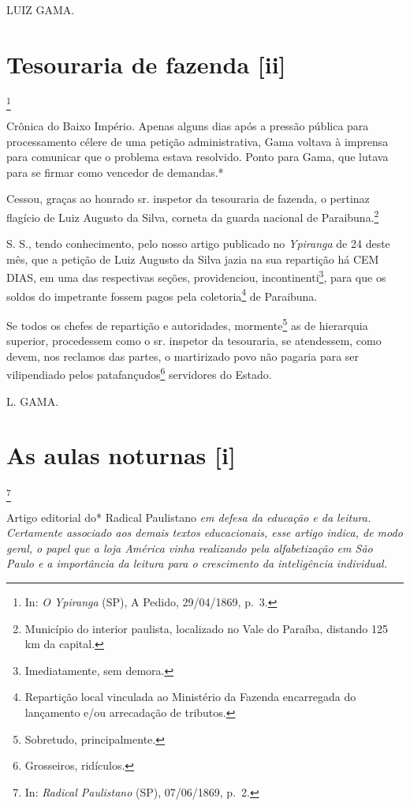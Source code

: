 LUIZ GAMA.

\chapter{Tesouraria de fazenda {[}ii{]}}\footnote{In: \emph{O Ypiranga}
  (SP), A Pedido, 29/04/1869, p.~3.}

\begin{didascalia}
Crônica do Baixo Império. Apenas alguns dias após a pressão pública para
processamento célere de uma petição administrativa, Gama voltava à
imprensa para comunicar que o problema estava resolvido. Ponto para
Gama, que lutava para se firmar como vencedor de demandas.*
\end{didascalia}

\asterisc{}

Cessou, graças ao honrado sr. inspetor da tesouraria de fazenda, o
pertinaz flagício de Luiz Augusto da Silva, corneta da guarda nacional
de Paraibuna.\footnote{Município do interior paulista, localizado no
  Vale do Paraíba, distando 125 km da capital.}

S. S., tendo conhecimento, pelo nosso artigo publicado no
\emph{Ypiranga} de 24 deste mês, que a petição de Luiz Augusto da Silva
jazia na sua repartição há CEM DIAS, em uma das respectivas seções,
providenciou, incontinenti\footnote{Imediatamente, sem demora.}, para
que os soldos do impetrante fossem pagos pela coletoria\footnote{
  Repartição local vinculada ao Ministério da Fazenda encarregada do
  lançamento e/ou arrecadação de tributos.} de Paraibuna.

Se todos os chefes de repartição e autoridades, mormente\footnote{
  Sobretudo, principalmente.} as de hierarquia superior, procedessem
como o sr. inspetor da tesouraria, se atendessem, como devem, nos
reclamos das partes, o martirizado povo não pagaria para ser
vilipendiado pelos patafançudos\footnote{Grosseiros, ridículos.}
servidores do Estado.

L. GAMA.

\chapter{As aulas noturnas {[}i{]}}\footnote{In: \emph{Radical Paulistano}
  (SP), 07/06/1869, p.~2.}

\begin{didascalia}
Artigo editorial do* Radical Paulistano \emph{em defesa da educação e da
leitura. Certamente associado aos demais textos educacionais, esse
artigo indica, de modo geral, o papel que a loja América vinha
realizando pela alfabetização em São Paulo e a importância da leitura
para o crescimento da inteligência individual.}
\end{didascalia}

